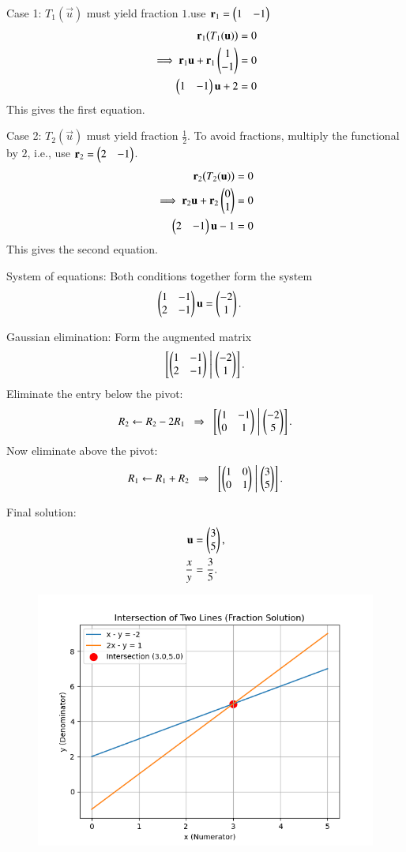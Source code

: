 \documentclass[journal]{IEEEtran}
\begin{document}
Case 1: $T_1(\vec{u})$ must yield fraction $1$.use $\mathbf{r}_1 = \begin{pmatrix}1 & -1\end{pmatrix}$
\begin{align}
\mathbf{r}_1 \big(T_1(\mathbf{u})\big) &= 0 \\
\implies \mathbf{r}_1\mathbf{u} + \mathbf{r}_1\begin{pmatrix}1 \\ -1\end{pmatrix} &= 0 \\
\begin{pmatrix}1 & -1\end{pmatrix}\mathbf{u} + 2 &= 0 
\end{align}
This gives the first equation.



Case 2: $T_2(\vec{u})$ must yield fraction $\tfrac{1}{2}$.  
To avoid fractions, multiply the functional by $2$, i.e., use $\mathbf{r}_2 = \begin{pmatrix}2 & -1\end{pmatrix}$.
\begin{align}
\mathbf{r}_2 \big(T_2(\mathbf{u})\big) &= 0 \\
\implies \mathbf{r}_2\mathbf{u} + \mathbf{r}_2\begin{pmatrix}0 \\ 1\end{pmatrix} &= 0 \\
\begin{pmatrix}2 & -1\end{pmatrix}\mathbf{u} - 1 &= 0 
\end{align}
This gives the second equation.



System of equations:  
Both conditions together form the system
\begin{align}
\begin{pmatrix}1 & -1 \\ 2 & -1\end{pmatrix}\mathbf{u} &= \begin{pmatrix}-2 \\ 1\end{pmatrix}.
\end{align}



Gaussian elimination:  
Form the augmented matrix
\begin{align}
\left[\begin{pmatrix}1 & -1 \\ 2 & -1\end{pmatrix} \;\middle|\; \begin{pmatrix}-2 \\ 1\end{pmatrix}\right].
\end{align}
Eliminate the entry below the pivot:
\begin{align}
R_2 \leftarrow R_2 - 2R_1 \;\;\Rightarrow\;\;
\left[\begin{pmatrix}1 & -1 \\ 0 & 1\end{pmatrix} \;\middle|\; \begin{pmatrix}-2 \\ 5\end{pmatrix}\right].
\end{align}
Now eliminate above the pivot:
\begin{align}
R_1 \leftarrow R_1 + R_2 \;\;\Rightarrow\;\;
\left[\begin{pmatrix}1 & 0 \\ 0 & 1\end{pmatrix} \;\middle|\; \begin{pmatrix}3 \\ 5\end{pmatrix}\right].
\end{align}



Final solution:
\begin{align}
\mathbf{u} &= \begin{pmatrix}3 \\ 5\end{pmatrix}, \\
\frac{x}{y} &= \frac{3}{5}.
\end{align}

\begin{figure}[H]
    \centering
    \includegraphics[width=0.5\columnwidth]{figs/fig1.png}
    \caption{}
    \label{fig:placeholder}
\end{figure}
\end{document}
